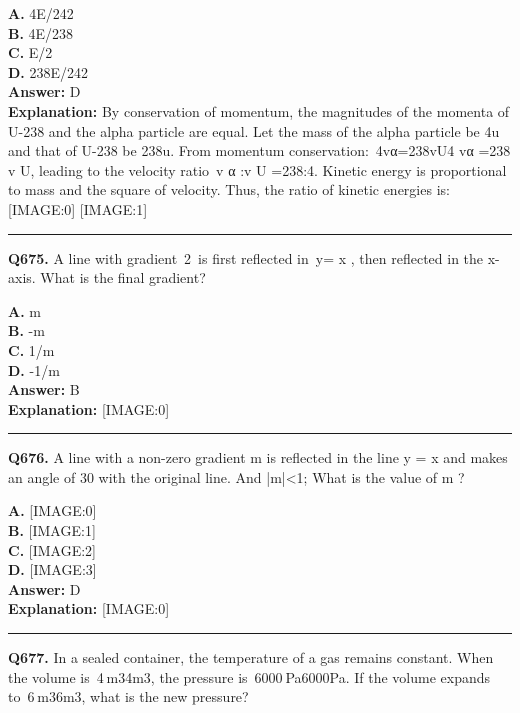 \documentclass[12pt]{article}
\begin{document}
\textbf{A.} 4E/242 \\
\textbf{B.} 4E/238 \\
\textbf{C.} E/2 \\
\textbf{D.} 238E/242 \\

\textbf{Answer:} D \\
\textbf{Explanation:} By conservation of momentum, the magnitudes of the momenta of U-238 and the alpha particle are equal. Let the mass of the alpha particle be 4u and that of U-238 be 238u.
From momentum conservation: 4vα=238vU4
vα
​=238
v
U​, leading to the velocity ratio v
α
:v
U
=238:4. Kinetic energy is proportional to mass and the square of velocity. Thus, the ratio of kinetic energies is:
[IMAGE:0]
[IMAGE:1]

\hrule
\vspace{1em}


\noindent
\textbf{Q675.} A line with gradient 2 is first reflected in y=
x
, then reflected in the x-axis. What is the final gradient?



\textbf{A.} m \\
\textbf{B.} -m \\
\textbf{C.} 1/m \\
\textbf{D.} -1/m \\

\textbf{Answer:} B \\
\textbf{Explanation:} [IMAGE:0]

\hrule
\vspace{1em}


\noindent
\textbf{Q676.} A line with a non-zero gradient
m
is reflected in the line
y
=
x
and makes an angle of
30
\circ 
with the original line.
And |m|<1;
What is the value of
m
?



\textbf{A.} [IMAGE:0] \\
\textbf{B.} [IMAGE:1] \\
\textbf{C.} [IMAGE:2] \\
\textbf{D.} [IMAGE:3] \\

\textbf{Answer:} D \\
\textbf{Explanation:} [IMAGE:0]

\hrule
\vspace{1em}


\noindent
\textbf{Q677.} In a sealed container, the temperature of a gas remains constant. When the volume is 4 m34m3, the pressure is 6000 Pa6000Pa. If the volume expands to 6 m36m3, what is the new pressure?
\end{document}
